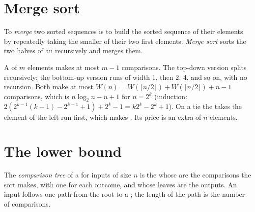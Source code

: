 \label{lst:b1:sorting:quicksort3}

\section{Merge sort}\label{sec:b1:sorting:merge}

\begin{definition}\label{def:b1:sorting:merge-sort}
To \emph{merge} two sorted sequences is to build the sorted sequence of their
elements by repeatedly taking the smaller of their two first elements. \emph{Merge sort} sorts the two
halves of an  recursively and merges them.
\end{definition}

\label{lst:b1:sorting:merge}

A  of $m$ elements makes at most $m - 1$ comparisons. The top-down version splits recursively; the bottom-up
version  runs of width 1, then 2, 4, and so on, with no recursion. Both make at most $W(n) = W(\lfloor n/2 \rfloor)
+ W(\lceil n/2 \rceil) + n - 1$ comparisons, which is $n \log_2 n - n + 1$ for $n = 2^k$ (induction: $2(2^{k-1}(k - 1) -
2^{k-1} + 1) + 2^k - 1 = k2^k - 2^k + 1$). On a tie the  takes the element of the left run first, which makes
 . Its price is an extra  of $n$ elements.

\label{out:b1:sorting:stable}

\section{The lower bound}\label{sec:b1:sorting:lower-bound}

\begin{definition}\label{def:b1:sorting:comparison-tree}
The \emph{comparison tree} of a  for inputs of size $n$ is the  whose
 are the comparisons the sort makes, with one  for each outcome, and whose leaves are the outputs.
An input follows one path from the root to a ; the length of the path is the number of comparisons.
\end{definition}

